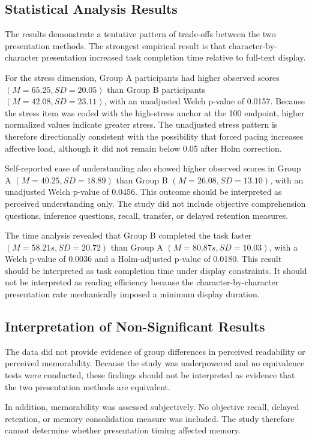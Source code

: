 \documentclass[authoryear]{elsarticle}
\begin{document}
\subsection{Statistical Analysis Results}
The results demonstrate a tentative pattern of trade-offs between the two presentation methods. The strongest empirical result is that character-by-character presentation increased task completion time relative to full-text display.

For the stress dimension, Group A participants had higher observed scores $(M = 65.25, SD = 20.05)$ than Group B participants $(M = 42.08, SD = 23.11)$, with an unadjusted Welch p-value of 0.0157. Because the stress item was coded with the high-stress anchor at the 100 endpoint, higher normalized values indicate greater stress. The unadjusted stress pattern is therefore directionally consistent with the possibility that forced pacing increases affective load, although it did not remain below 0.05 after Holm correction.

Self-reported ease of understanding also showed higher observed scores in Group A $(M = 40.25, SD = 18.89)$ than Group B $(M = 26.08, SD = 13.10)$, with an unadjusted Welch p-value of 0.0456. This outcome should be interpreted as perceived understanding only. The study did not include objective comprehension questions, inference questions, recall, transfer, or delayed retention measures.

The time analysis revealed that Group B completed the task faster $(M = 58.21s, SD = 20.72)$ than Group A $(M = 80.87s, SD = 10.03)$, with a Welch p-value of 0.0036 and a Holm-adjusted p-value of 0.0180. This result should be interpreted as task completion time under display constraints. It should not be interpreted as reading efficiency because the character-by-character presentation rate mechanically imposed a minimum display duration.

\subsection{Interpretation of Non-Significant Results}
The data did not provide evidence of group differences in perceived readability or perceived memorability. Because the study was underpowered and no equivalence tests were conducted, these findings should not be interpreted as evidence that the two presentation methods are equivalent.

In addition, memorability was assessed subjectively. No objective recall, delayed retention, or memory consolidation measure was included. The study therefore cannot determine whether presentation timing affected memory.
\end{document}
